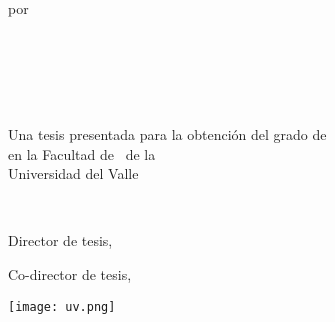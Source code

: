 \maketitle

\thispagestyle{empty}
\longvertspacing{}
\begin{tightcenter}
  por
\end{tightcenter}
\mylinespacing{}
\begin{tightcenter}
  \myname{}
\end{tightcenter}
{~\\~\\~\\~\\}
\begin{tightcenter}
  Una tesis presentada para la obtención del grado de \degreetype\\
  en la Facultad de \myprogram~de la  \\
  Universidad del Valle
\end{tightcenter}
\mylinespacing{}
\begin{tightcenter}
  \mymonth~\myyear{}
\end{tightcenter}
\mylinespacing{}
\begin{tightcenter}
  Director de tesis, \myadvisor{}
\end{tightcenter}
\begin{tightcenter}
  Co-director de tesis, \committeememberA{}
\end{tightcenter}
\vspace{8mm}
\begin{tightcenter}
  \begin{minipage}{0.11\textwidth}
    \texttt{[image: uv.png]}
  \end{minipage}
\end{tightcenter}

